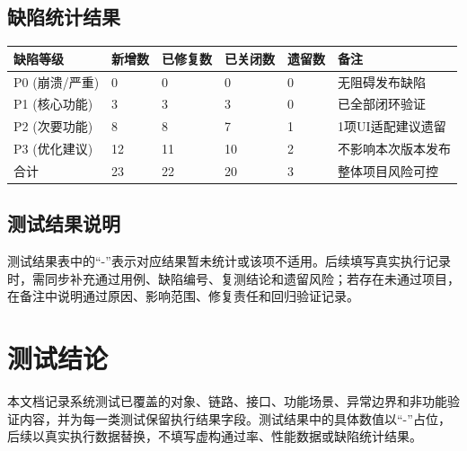 \subsection{缺陷统计结果}

\begin{longtable}{p{2.0cm}p{2.0cm}p{2.0cm}p{2.0cm}p{2.0cm}p{2.4cm}}
\toprule
缺陷等级 & 新增数 & 已修复数 & 已关闭数 & 遗留数 & 备注 \\
\midrule
P0 (崩溃/严重) & 0  & 0  & 0  & 0 & 无阻碍发布缺陷 \\
P1 (核心功能) & 3  & 3  & 3  & 0 & 已全部闭环验证 \\
P2 (次要功能) & 8  & 8  & 7  & 1 & 1项UI适配建议遗留 \\
P3 (优化建议) & 12 & 11 & 10 & 2 & 不影响本次版本发布 \\
合计 & 23 & 22 & 20 & 3 & 整体项目风险可控 \\
\bottomrule
\end{longtable}

\subsection{测试结果说明}

测试结果表中的“-”表示对应结果暂未统计或该项不适用。后续填写真实执行记录时，需同步补充通过用例、缺陷编号、复测结论和遗留风险；若存在未通过项目，在备注中说明通过原因、影响范围、修复责任和回归验证记录。
\section{测试结论}

本文档记录系统测试已覆盖的对象、链路、接口、功能场景、异常边界和非功能验证内容，并为每一类测试保留执行结果字段。测试结果中的具体数值以“-”占位，后续以真实执行数据替换，不填写虚构通过率、性能数据或缺陷统计结果。

